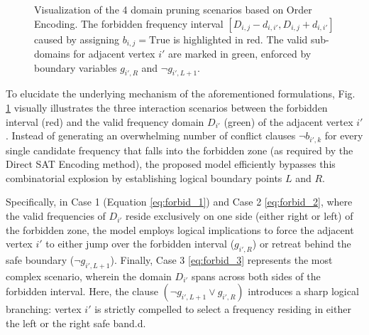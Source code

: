 \documentclass[letterpaper,journal]{IEEEtran}
\begin{document}
\begin{figure}[htbp]
\caption{Visualization of the 4 domain pruning scenarios based on Order Encoding. The forbidden frequency interval $[D_{i,j} - d_{i,i'}, D_{i,j} + d_{i,i'}]$ caused by assigning $b_{i,j} = \text{True}$ is highlighted in red. The valid sub-domains for adjacent vertex $i'$ are marked in green, enforced by boundary variables $g_{i',R}$ and $\neg g_{i',L+1}$.}
\label{fig:domain_pruning_cases}
\end{figure}

To elucidate the underlying mechanism of the aforementioned formulations, Fig. \ref{fig:domain_pruning_cases} visually illustrates the three interaction scenarios between the forbidden interval (red) and the valid frequency domain $D_{i'}$ (green) of the adjacent vertex $i'$. Instead of generating an overwhelming number of conflict clauses $\neg b_{i',k}$ for every single candidate frequency that falls into the forbidden zone (as required by the Direct SAT Encoding method), the proposed model efficiently bypasses this combinatorial explosion by establishing logical boundary points $L$ and $R$.

Specifically, in Case 1 (Equation \eqref{eq:forbid_1}) and Case 2 \eqref{eq:forbid_2}, where the valid frequencies of $D_{i'}$ reside exclusively on one side (either right or left) of the forbidden zone, the model employs logical implications to force the adjacent vertex $i'$ to either jump over the forbidden interval ($g_{i',R}$) or retreat behind the safe boundary ($\neg g_{i',L+1}$). Finally, Case 3 \eqref{eq:forbid_3} represents the most complex scenario, wherein the domain $D_{i'}$ spans across both sides of the forbidden interval. Here, the clause $(\neg g_{i',L+1} \lor g_{i',R})$ introduces a sharp logical branching: vertex $i'$ is strictly compelled to select a frequency residing in either the left or the right safe band.d. 
\end{document}
